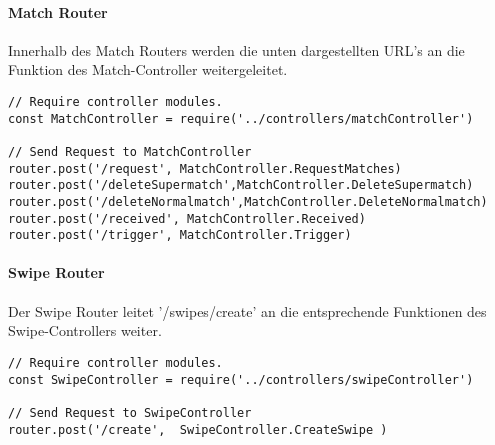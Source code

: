 \paragraph{Match Router}
Innerhalb des Match Routers werden die unten dargestellten URL's an die Funktion des Match-Controller weitergeleitet.

\begin{lstlisting}[caption=Routing in matchRouter.js, label=lst:routingmatch]
// Require controller modules.
const MatchController = require('../controllers/matchController')

// Send Request to MatchController
router.post('/request', MatchController.RequestMatches)
router.post('/deleteSupermatch',MatchController.DeleteSupermatch)
router.post('/deleteNormalmatch',MatchController.DeleteNormalmatch)
router.post('/received', MatchController.Received)
router.post('/trigger', MatchController.Trigger)
\end{lstlisting}


\paragraph{Swipe Router}
Der Swipe Router leitet '/swipes/create' an die entsprechende Funktionen des Swipe-Controllers weiter.

\begin{lstlisting}[caption=Routing in swipeRouter.js, label=lst:routingswipe]
// Require controller modules.
const SwipeController = require('../controllers/swipeController')

// Send Request to SwipeController
router.post('/create',  SwipeController.CreateSwipe )
\end{lstlisting}









